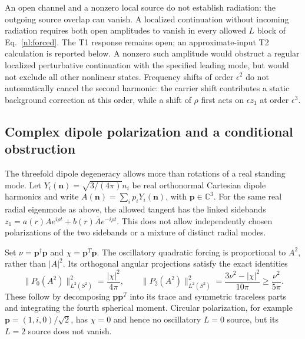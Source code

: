 An open channel and a nonzero local source do not establish radiation:
the outgoing source overlap can vanish. A localized continuation without
incoming radiation requires both open amplitudes to vanish in every
allowed $L$ block of Eq.~\eqref{nl:forced}. The T1 response remains open;
an approximate-input T2 calculation is reported below. A nonzero such amplitude would obstruct
a regular localized perturbative continuation with the specified leading
mode, but would not exclude all other nonlinear states. Frequency shifts
of order $\epsilon^2$ do not automatically cancel the second harmonic:
the carrier shift contributes a static background correction at this
order, while a shift of $\rho$ first acts on $\epsilon z_1$ at order
$\epsilon^3$.

\subsection{Complex dipole polarization and a conditional obstruction}
\label{nl:polarization}
The threefold dipole degeneracy allows more than rotations of a real
standing mode. Let $Y_i(\boldsymbol n)=\sqrt{3/(4\pi)}n_i$ be real
orthonormal Cartesian dipole harmonics and write
$A(\boldsymbol n)=\sum_i p_iY_i(\boldsymbol n)$, with
$\boldsymbol p\in\mathbb C^3$. For the same real radial eigenmode as above,
the allowed tangent has the linked sidebands
$z_1=a(r)A e^{i\rho t}+b(r)\overline A e^{-i\rho t}$.
This does not allow independently chosen polarizations of the two
sidebands or a mixture of distinct radial modes.

Set $\nu=\boldsymbol p^\dagger\boldsymbol p$ and
$\chi=\boldsymbol p^T\boldsymbol p$. The oscillatory quadratic forcing
is proportional to $A^2$, rather than $|A|^2$. Its orthogonal angular
projections satisfy the exact identities
\begin{equation}
 \|P_0(A^2)\|_{L^2(S^2)}^2=\frac{|\chi|^2}{4\pi},\qquad
 \|P_2(A^2)\|_{L^2(S^2)}^2
 =\frac{3\nu^2-|\chi|^2}{10\pi}\geq\frac{\nu^2}{5\pi}.
 \label{nl:polarization-norms}
\end{equation}
These follow by decomposing $\boldsymbol p\boldsymbol p^T$ into its trace
and symmetric traceless parts and integrating the fourth spherical
moment. Circular polarization, for example
$\boldsymbol p=(1,i,0)/\sqrt2$, has $\chi=0$ and hence no oscillatory
$L=0$ source, but its $L=2$ source does not vanish.

